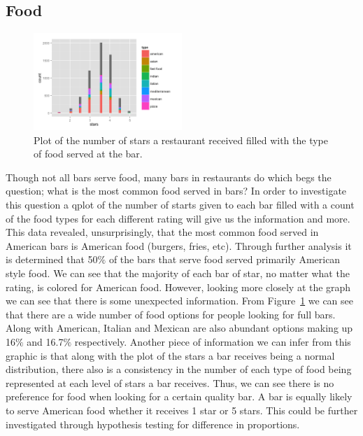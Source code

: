 \documentclass[11pt]{article}
\begin{document}
\subsection{Food}

\begin{figure}[h!]
  \caption{Plot of the number of stars a restaurant received filled with the type of food served at the bar.}
  \centering
  \label{food}
    \includegraphics[width=0.5\textwidth]{Figures/Food_bars.png}
\end{figure}

Though not all bars serve food, many bars in restaurants do which begs the question; what is the most common food served in bars?  In order to investigate this question a qplot of the number of starts given to each bar filled with a count of the food types for each different rating will give us the information and more.  This data revealed, unsurprisingly, that the most common food served in American bars is American food (burgers, fries, etc). Through further analysis it is determined that 50$\%$ of the bars that serve food served primarily American style food.  We can see that the majority of each bar of star, no matter what the rating, is colored for American food.  However, looking more closely at the graph we can see that there is some unexpected information.  From Figure~\ref{food} we can see that there are a wide number of food options for people looking for full bars.  Along with American, Italian and Mexican are also abundant options making up 16$\%$ and 16.7$\%$ respectively.  Another piece of information we can infer from this graphic is that along with the plot of the stars a bar receives being a normal distribution, there also is a consistency in the number of each type of food being represented at each level of stars a bar receives.  Thus, we can see there is no preference for food when looking for a certain quality bar. A bar is equally likely to serve American food whether it receives 1 star or 5 stars.  This could be further investigated through hypothesis testing for difference in proportions.
\end{document}
